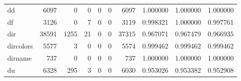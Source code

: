 \begin{longtable}{lrrrrrrrrr}
dd        &                                               6097 &                                                  0 &                                                  0 &                                                  0 &                                                  0 &                                               6097 &                                           1.000000 &                               1.000000 &                             1.000000 \\
df        &                                               3126 &                                                  0 &                                                  7 &                                                  0 &                                                  0 &                                               3119 &                                           0.998321 &                               1.000000 &                             0.997761 \\
dir       &                                              38591 &                                               1255 &                                                 21 &                                                  0 &                                                  0 &                                              37315 &                                           0.967071 &                               0.967479 &                             0.966935 \\
dircolors &                                               5577 &                                                  3 &                                                  0 &                                                  0 &                                                  0 &                                               5574 &                                           0.999462 &                               0.999462 &                             0.999462 \\
dirname   &                                                737 &                                                  0 &                                                  0 &                                                  0 &                                                  0 &                                                737 &                                           1.000000 &                               1.000000 &                             1.000000 \\
du        &                                               6328 &                                                295 &                                                  3 &                                                  0 &                                                  0 &                                               6030 &                                           0.953026 &                               0.953382 &                             0.952908 \\

\end{longtable}
